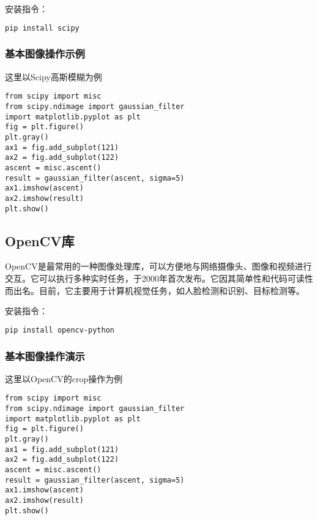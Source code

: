 \documentclass[UTF8]{gyh}
\begin{document}
安装指令：
\begin{lstlisting}[language=bash]
pip install scipy
\end{lstlisting}

\subsubsection{基本图像操作示例}

这里以Scipy高斯模糊为例

\begin{lstlisting}
from scipy import misc
from scipy.ndimage import gaussian_filter
import matplotlib.pyplot as plt
fig = plt.figure()
plt.gray()
ax1 = fig.add_subplot(121)
ax2 = fig.add_subplot(122)
ascent = misc.ascent()
result = gaussian_filter(ascent, sigma=5)
ax1.imshow(ascent)
ax2.imshow(result)
plt.show()
\end{lstlisting}


\subsection{OpenCV库}

OpenCV是最常用的一种图像处理库，可以方便地与网络摄像头、图像和视频进行交互。它可以执行多种实时任务，于2000年首次发布。它因其简单性和代码可读性而出名。目前，它主要用于计算机视觉任务，如人脸检测和识别、目标检测等。

安装指令：
\begin{lstlisting}[language=bash]
pip install opencv-python
\end{lstlisting}

\subsubsection{基本图像操作演示}

这里以OpenCV的crop操作为例

\begin{lstlisting}
from scipy import misc
from scipy.ndimage import gaussian_filter
import matplotlib.pyplot as plt
fig = plt.figure()
plt.gray()
ax1 = fig.add_subplot(121)
ax2 = fig.add_subplot(122)
ascent = misc.ascent()
result = gaussian_filter(ascent, sigma=5)
ax1.imshow(ascent)
ax2.imshow(result)
plt.show()
\end{lstlisting}

\end{document}
